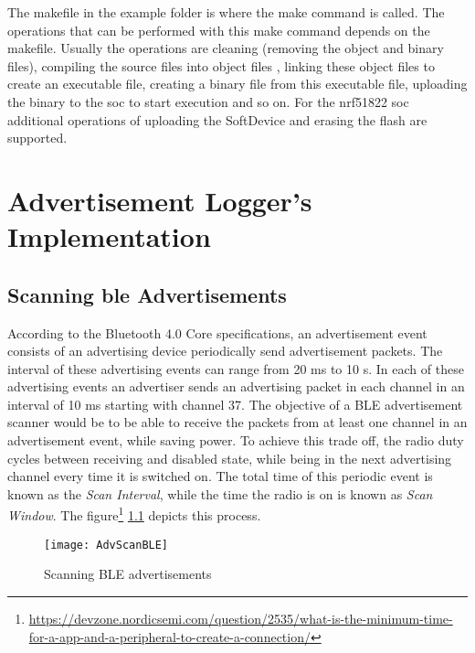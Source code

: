 The makefile in the example folder is where the make command is called. The operations that can be performed with this make command depends on the makefile. Usually the operations are cleaning (removing the object and binary files), compiling the source files into object files , linking these object files to create an executable file, creating a binary file from this executable file, uploading the binary to the \gls{soc} to start execution and so on. For the nrf51822 \gls{soc} additional operations of uploading the SoftDevice and erasing the flash are supported.



\chapter{Advertisement Logger's Implementation} \label{ApdxAdvLog}

\section{Scanning \texorpdfstring{\gls{ble}}{BLE} Advertisements}

According to the Bluetooth 4.0 Core specifications, an advertisement event consists of an advertising device periodically send advertisement packets. The interval of these advertising events can range from 20 ms to 10 s. In each of these advertising events an advertiser sends an advertising packet in each channel in an interval of 10 ms starting with channel 37. The objective of a BLE advertisement scanner would be to be able to receive the packets from at least one channel in an advertisement event, while saving power. To achieve this trade off, the radio duty cycles between receiving and disabled state, while being in the next advertising channel every time it is switched on. The total time of this periodic event is known as the \emph{Scan Interval}, while the time the radio is on is known as \emph{Scan Window}. The figure\footnote{\href{https://devzone.nordicsemi.com/question/2535/what-is-the-minimum-time-for-a-app-and-a-peripheral-to-create-a-connection/}{https://devzone.nordicsemi.com/question/2535/what-is-the-minimum-time-for-a-app-and-a-peripheral-to-create-a-connection/}} \ref{fig:AdvScanBLE} depicts this process.

\begin{figure}[h]
\centering
\texttt{[image: AdvScanBLE]}
\caption{Scanning BLE advertisements}
\label{fig:AdvScanBLE}
\end{figure}

